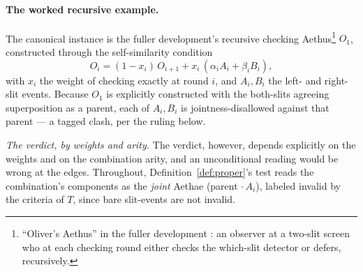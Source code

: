 \paragraph{The worked recursive example.} The canonical instance is the fuller development's recursive checking Aethus\footnote{``Oliver's Aethus'' in the fuller development \cite{Aethus, AethusBrief}: an observer at a two-slit screen who at each checking round either checks the which-slit detector or defers, recursively.} $O_1$, constructed through the self-similarity condition
\[
O_i = (1 - x_i)\, O_{i+1} + x_i\, (\alpha_i A_i + \beta_i B_i),
\]
with $x_i$ the weight of checking exactly at round $i$, and $A_i, B_i$ the left- and right-slit events. Because $O_1$ is explicitly constructed with the both-slits agreeing superposition as a parent, each of $A_i, B_i$ is jointness-disallowed against that parent --- a tagged clash, per the ruling below.

\textit{The verdict, by weights and arity.} The verdict, however, depends explicitly on the weights and on the combination arity, and an unconditional reading would be wrong at the edges. Throughout, Definition~\ref{def:proper}'s test reads the combination's components as the \emph{joint} Aethae (parent $\cdot\, A_i$), labeled invalid by the criteria of $T$, since bare slit-events are not invalid.

